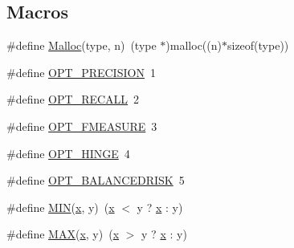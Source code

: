 \subsection*{Macros}
\begin{DoxyCompactItemize}
\item 
\#define \hyperlink{_2svm-train_8cpp_a9191047fd644a5f519152ecb4aa60357}{Malloc}(type, n)~(type $\ast$)malloc((n)$\ast$sizeof(type))
\item 
\#define \hyperlink{_2svm-train_8cpp_a3b4c01e0da1a3811cb4a826e9195bded}{O\-P\-T\-\_\-\-P\-R\-E\-C\-I\-S\-I\-O\-N}~1
\item 
\#define \hyperlink{_2svm-train_8cpp_a8731e6e890928e6058488d8d11ff53de}{O\-P\-T\-\_\-\-R\-E\-C\-A\-L\-L}~2
\item 
\#define \hyperlink{_2svm-train_8cpp_a565d2328dc3467a90c2181480d9e9cc7}{O\-P\-T\-\_\-\-F\-M\-E\-A\-S\-U\-R\-E}~3
\item 
\#define \hyperlink{_2svm-train_8cpp_a9e0dc2a94ebfe16c57b1b54d3e011d55}{O\-P\-T\-\_\-\-H\-I\-N\-G\-E}~4
\item 
\#define \hyperlink{_2svm-train_8cpp_a534c2d1c329720ab36237c4d297a2b20}{O\-P\-T\-\_\-\-B\-A\-L\-A\-N\-C\-E\-D\-R\-I\-S\-K}~5
\item 
\#define \hyperlink{_2svm-train_8cpp_a74e75242132eaabbc1c512488a135926}{M\-I\-N}(\hyperlink{_2svm-predict_8cpp_a9a5b72a4065074cac5da07efb80a1e79}{x}, y)~(\hyperlink{_2svm-predict_8cpp_a9a5b72a4065074cac5da07efb80a1e79}{x} $<$ y ? \hyperlink{_2svm-predict_8cpp_a9a5b72a4065074cac5da07efb80a1e79}{x} \-: y)
\item 
\#define \hyperlink{_2svm-train_8cpp_aacc3ee1a7f283f8ef65cea31f4436a95}{M\-A\-X}(\hyperlink{_2svm-predict_8cpp_a9a5b72a4065074cac5da07efb80a1e79}{x}, y)~(\hyperlink{_2svm-predict_8cpp_a9a5b72a4065074cac5da07efb80a1e79}{x} $>$ y ? \hyperlink{_2svm-predict_8cpp_a9a5b72a4065074cac5da07efb80a1e79}{x} \-: y)
\end{DoxyCompactItemize}
